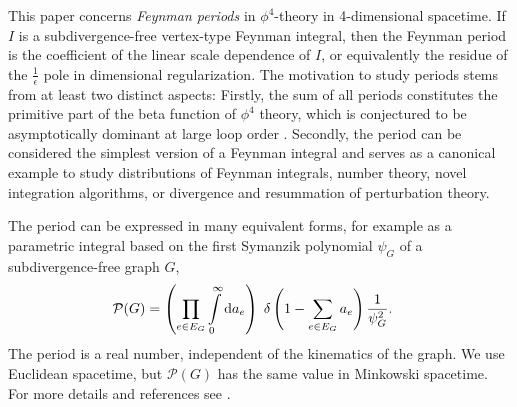 \documentclass[12pt]{article}
\numberwithin{equation}{section}
\renewcommand{\d}{\textnormal{d}}
\newcommand{\period}{\mathcal P}
\begin{document}
This paper concerns \emph{Feynman periods} \cite{broadhurst_knots_1995,schnetz_quantum_2010} in $\phi^4$-theory in 4-dimensional spacetime. If $I$ is a subdivergence-free vertex-type Feynman integral, then the Feynman period is the coefficient of the linear scale dependence of $I$, or equivalently the residue of the $\frac 1 \epsilon$ pole in dimensional regularization.
The motivation to study periods stems from at least two distinct aspects: Firstly, the sum of all periods constitutes the primitive part of the beta function of $\phi^4$ theory, which is conjectured to be asymptotically dominant at large loop order \cite{brezin_perturbation_1977,mckane_nonperturbative_1984}. Secondly, the period can be considered the simplest version of a Feynman integral and serves as a canonical example to study distributions of Feynman integrals, number theory, novel integration algorithms, or divergence and resummation of perturbation theory.  

The period can be expressed in many equivalent forms, for example as a parametric integral based on the first Symanzik polynomial $\psi_G$ of a subdivergence-free graph $G$,
\begin{align}\label{def:period}
	\period (G)&=  \left( \prod_{e\in E_G} \int \limits_0^\infty \d a_e  \right)   \; \delta \left( 1-\sum_{e\in E_G}  a_e \right) \frac{1} {\psi_G^{ 2}}.
\end{align} 
The period is a real number, independent of the kinematics of the graph. We use Euclidean spacetime, but $\period(G)$ has the same value in Minkowski spacetime. For more details and references see \cite{schnetz_quantum_2010,kompaniets_minimally_2017,schnetz_numbers_2018,balduf_statistics_2023}. 
\end{document}
